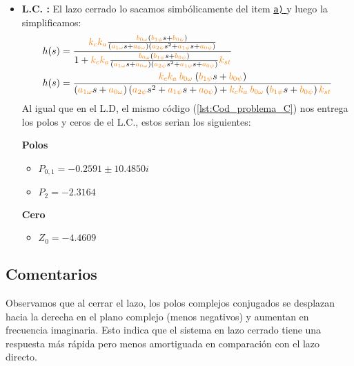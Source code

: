\begin{itemize}
    \item \textbf{L.C. :} El lazo cerrado lo sacamos simbólicamente del item \hyperref[pregunta-a]{\texttt{a)} } y luego la simplificamos:
    \begin{align*}
        &h(s) = \dfrac{\nara{k_ck_a} \frac{\nara{\nara{b_{0\omega}}}\left(\nara{b_{1\psi}}s + \nara{b_{0\psi}}\right)}
        {\left(\nara{a_{1\omega}}s + \nara{a_{0\omega}}\right)\left(\nara{a_{2\psi}}s^{2} + \nara{a_{1\psi}}s + \nara{a_{0\psi}}\right)}}{1+\nara{k_ck_a} \frac{\nara{\nara{b_{0\omega}}}\left(\nara{b_{1\psi}}s + \nara{b_{0\psi}}\right)}
        {\left(\nara{a_{1\omega}}s + \nara{a_{0\omega}}\right)\left(\nara{a_{2\psi}}s^{2} + \nara{a_{1\psi}}s + \nara{a_{0\psi}}\right)}\nara{k_{st}}} \\
        &h(s) = \dfrac{     \nara{k_ck_a}    \nara{\nara{b_{0\omega}}}\left(\nara{b_{1\psi}}s + \nara{b_{0\psi}}\right) }  {     \left(\nara{a_{1\omega}}s + \nara{a_{0\omega}}\right)\left(\nara{a_{2\psi}}s^{2} + \nara{a_{1\psi}}s + \nara{a_{0\psi}}\right)    + \nara{k_ck_a}     \nara{\nara{b_{0\omega}}}\left(\nara{b_{1\psi}}s + \nara{b_{0\psi}}\right)   
       \nara{k_{st}}}
    \end{align*}
    Al igual que en el L.D, el mismo código (\autoref{lst:Cod_problema_C}) nos entrega los polos y ceros de el L.C., estos serian los siguientes:
    \begin{multicols}{2}
        \textbf{Polos}
        \begin{itemize}
            \item \(P_{0,1} = -0.2591 \pm 10.4850i\) 
            \item \(P_2 = -2.3164 \)
        \end{itemize}
        \columnbreak
        \textbf{Cero}
        \begin{itemize}
            \item \(Z_0 = -4.4609\)
        \end{itemize}
      \end{multicols}
\end{itemize}





\FloatBarrier
\subsection{Comentarios}


Observamos que al cerrar el lazo, los polos complejos conjugados se desplazan hacia la derecha en el plano complejo (menos negativos) y aumentan en frecuencia imaginaria. Esto indica que el sistema en lazo cerrado tiene una respuesta más rápida pero menos amortiguada en comparación con el lazo directo.

